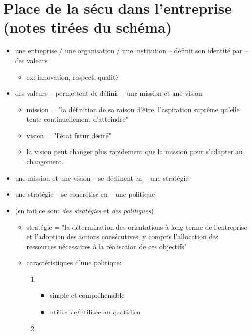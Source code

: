 \documentclass[a4paper]{article}
\begin{document}
\section{Place de la sécu dans l'entreprise (notes tirées du schéma)}





\begin{itemize}
    \item une entreprise / une organisation / une institution -- définit son identité par -- des valeurs
    \begin{itemize}
        \item ex: innovation, respect, qualité
    \end{itemize}
    \item des valeurs -- permettent de définir -- une mission et une vision
    \begin{itemize}
        \item mission = "la définition de sa raison d’être, l’aspiration suprême qu’elle tente continuellement d’atteindre"
        \item vision = "l’état futur désiré"
        \item la vision peut changer plus rapidement que la mission pour s’adapter au changement.
    \end{itemize}
    \item une mission et une vision -- se déclinent en -- une stratégie
    \item une stratégie -- se concrétise en -- une politique
    \item (en fait ce sont \textit{des stratégies} et \textit{des politiques})
    \begin{itemize}
        \item stratégie = "la détermination des orientations à long terme de l’entreprise et l’adoption des actions consécutives, y compris l’allocation des ressources nécessaires à la réalisation de ces objectifs"
        \item caractéristiques d'une politique:
        \begin{enumerate}
            \item
            \begin{itemize}
                \item simple et compréhensible
                \item utilisable/utilisée au quotidien
            \end{itemize}
            \item 

\end{enumerate}
\end{itemize}
\end{itemize}
\end{document}
